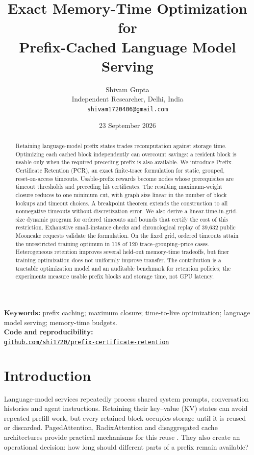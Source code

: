 \documentclass[11pt,a4paper]{article}
\title{\vspace{-8mm}\textbf{Exact Memory-Time Optimization for\\ Prefix-Cached Language Model Serving}}
\author{Shivam Gupta\\\small Independent Researcher, Delhi, India\\\small\texttt{shivam1720406@gmail.com}}
\date{23 September 2026}
\begin{document}
\maketitle
\begin{abstract}
Retaining language-model prefix states trades recomputation against storage time.
Optimizing each cached block independently can overcount savings: a resident block
is usable only when the required preceding prefix is also available. We introduce
Prefix-Certificate Retention (PCR), an exact finite-trace formulation for static,
grouped, reset-on-access timeouts. Usable-prefix rewards become nodes whose
prerequisites are timeout thresholds and preceding hit certificates. The resulting
maximum-weight closure reduces to one minimum cut, with graph size linear in the
number of block lookups and timeout choices. A breakpoint theorem extends the
construction to all nonnegative timeouts without discretization error. We also
derive a linear-time-in-grid-size dynamic program for ordered timeouts and bounds
that certify the cost of this restriction. Exhaustive small-instance checks and
chronological replay of 39,632 public Mooncake requests validate the formulation.
On the fixed grid, ordered timeouts attain the unrestricted training optimum in
118 of 120 trace--grouping--price cases. Heterogeneous retention improves several
held-out memory-time tradeoffs, but finer training optimization does not uniformly
improve transfer. The contribution is a tractable optimization model and an
auditable benchmark for retention policies; the experiments measure usable prefix
blocks and storage time, not GPU latency.
\end{abstract}
\noindent\textbf{Keywords:} prefix caching; maximum closure; time-to-live optimization;
language model serving; memory-time budgets.\\
\textbf{Code and reproducibility:}\\
\href{https://github.com/shi1720/prefix-certificate-retention}{\texttt{github.com/shi1720/prefix-certificate-retention}}

\section{Introduction}
Language-model services repeatedly process shared system prompts, conversation
histories and agent instructions. Retaining their key--value (KV) states can avoid
repeated prefill work, but every retained block occupies storage until it is reused
or discarded. PagedAttention, RadixAttention and disaggregated cache architectures
provide practical mechanisms for this reuse \cite{paged,sglang,mooncake}. They also
create an operational decision: how long should different parts of a prefix remain
available?
\end{document}
